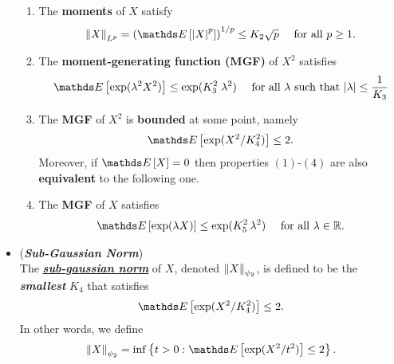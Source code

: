 \documentclass[11pt]{article}
\begin{document}
\begin{itemize}
\begin{proposition}
\begin{enumerate}
\item The \textbf{moments} of $X$ satisfy
\begin{align*}
\norm{X}{L^p} = \paren{\E{}{\abs{X}^p}}^{1/p} \le K_2 \sqrt{p}\quad \text{ for all }p \ge 1.
\end{align*}

\item The \textbf{moment-generating function (MGF)} of $X^2$ satisfies
\begin{align*}
\E{}{\exp(\lambda^2 X^2)} \le \exp(K_3^2 \;\lambda^2) \quad \text{ for all $\lambda$ such that $\abs{\lambda} \le \frac{1}{K_3}$}
\end{align*}

\item The \textbf{MGF} of $X^2$ is \textbf{bounded} at some point, namely
\begin{align*}
\E{}{\exp(X^2 / K_4^2)} \le 2.
\end{align*}
Moreover, if $\E{}{X} = 0$ then properties $(1)$-$(4)$ are also \textbf{equivalent} to the following one.

\item The \textbf{MGF} of $X$ satisfies
\begin{align*}
\E{}{\exp(\lambda X)} \le  \exp(K_5^2\,\lambda^2)\quad\text{ for all }\lambda \in \bR.
\end{align*}
\end{enumerate}
\end{proposition}

\item \begin{definition} (\textbf{\emph{Sub-Gaussian Norm}}) \\
The \underline{\emph{\textbf{sub-gaussian norm}}} of $X$, denoted $\left\|X\right\|_{\psi_2}$, is defined
to be the \emph{\textbf{smallest}} $K_4$ that satisfies 
\begin{align*}
\E{}{\exp(X^2 / K_4^2)} \le 2.
\end{align*} In other words, we define
\begin{align}
\norm{X}{\psi_2}= \inf\set{t > 0: \E{}{\exp(X^2 / t^2)} \le 2}.  \label{eqn: sub_gaussian_norm}
\end{align}
\end{definition}


\end{itemize}
\end{document}
